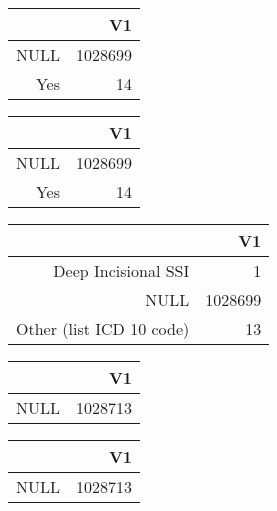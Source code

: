 \bigskip\bigskip
\centering
\begin{tabular}{rr}
  \hline
 & V1 \\ 
  \hline
NULL & 1028699 \\ 
  Yes &  14 \\ 
   \hline
\end{tabular}

\bigskip\bigskip
\centering
\begin{tabular}{rr}
  \hline
 & V1 \\ 
  \hline
NULL & 1028699 \\ 
  Yes &  14 \\ 
   \hline
\end{tabular}

\bigskip\bigskip
\centering
\begin{tabular}{rr}
  \hline
 & V1 \\ 
  \hline
Deep Incisional SSI &   1 \\ 
  NULL & 1028699 \\ 
  Other (list ICD 10 code) &  13 \\ 
   \hline
\end{tabular}

\bigskip\bigskip
\centering
\begin{tabular}{rr}
  \hline
 & V1 \\ 
  \hline
NULL & 1028713 \\ 
   \hline
\end{tabular}

\bigskip\bigskip
\centering
\begin{tabular}{rr}
  \hline
 & V1 \\ 
  \hline
NULL & 1028713 \\ 
   \hline
\end{tabular}

